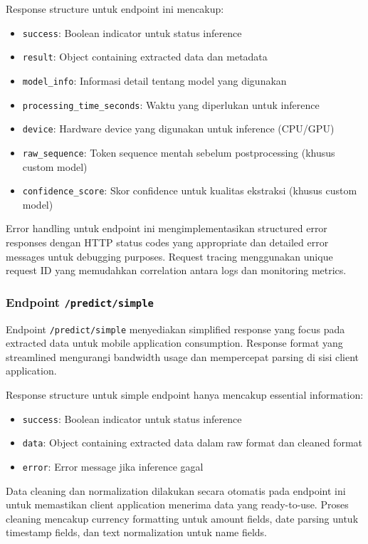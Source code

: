 Response structure untuk endpoint ini mencakup:
\begin{itemize}
    \item \texttt{success}: Boolean indicator untuk status inference
    \item \texttt{result}: Object containing extracted data dan metadata
    \item \texttt{model\_info}: Informasi detail tentang model yang digunakan
    \item \texttt{processing\_time\_seconds}: Waktu yang diperlukan untuk inference
    \item \texttt{device}: Hardware device yang digunakan untuk inference (CPU/GPU)
    \item \texttt{raw\_sequence}: Token sequence mentah sebelum postprocessing (khusus custom model)
    \item \texttt{confidence\_score}: Skor confidence untuk kualitas ekstraksi (khusus custom model)
\end{itemize}

Error handling untuk endpoint ini mengimplementasikan structured error responses dengan HTTP status codes yang appropriate dan detailed error messages untuk debugging purposes. Request tracing menggunakan unique request ID yang memudahkan correlation antara logs dan monitoring metrics.

\subsubsection{Endpoint \texttt{/predict/simple}}
\label{subsubsec:endpoint-predict-simple}

Endpoint \texttt{/predict/simple} menyediakan simplified response yang focus pada extracted data untuk mobile application consumption. Response format yang streamlined mengurangi bandwidth usage dan mempercepat parsing di sisi client application.

Response structure untuk simple endpoint hanya mencakup essential information:
\begin{itemize}
    \item \texttt{success}: Boolean indicator untuk status inference
    \item \texttt{data}: Object containing extracted data dalam raw format dan cleaned format
    \item \texttt{error}: Error message jika inference gagal
\end{itemize}

Data cleaning dan normalization dilakukan secara otomatis pada endpoint ini untuk memastikan client application menerima data yang ready-to-use. Proses cleaning mencakup currency formatting untuk amount fields, date parsing untuk timestamp fields, dan text normalization untuk name fields.

